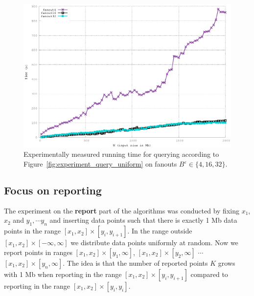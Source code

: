 \documentclass[twoside,11pt,openright]{report}
\def \epsilon {\varepsilon}
\begin{document}
\begin{figure}[htp!]
\centering
\includegraphics[width=\textwidth]{../src/experiments/gerth_query_fanout_experiment_results/2016-05-19.19_04_49/time}
\caption{Experimentally measured running time for querying according to Figure~\ref{fig:experiment_query_uniform} on fanouts $B^\epsilon \in \{4, 16, 32 \}$.}
\label{fig:gerth_query_fanout_experiment}
\end{figure}

\clearpage

\subsection{Focus on reporting}

The experiment on the \textbf{report} part of the algorithms was conducted by fixing $x_1$, $x_2$ and $y_1, \cdots y_n$ and inserting data points such that there is exactly 
1 Mb data points in the range $[x_1, x_2] \times [y_i, y_{i+1}]$. In the range outside  $[x_1, x_2] \times [- \infty, \infty]$ we distribute data points uniformly at random. Now we report points in ranges $[x_1, x_2] \times [y_1, \infty]$, $[x_1, x_2] \times [y_2, \infty]$ $\cdots$ $[x_1, x_2] \times [y_n, \infty]$. The idea is that the number of reported points $K$ grows with 1 Mb when reporting in the range $[x_1, x_2] \times [y_i, y_{i+1}]$ compared to reporting in the range $[x_1, x_2] \times [y_i, y_{i}]$.
\end{document}
